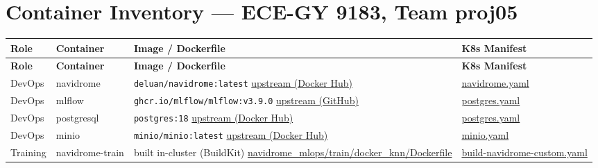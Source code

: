 \documentclass[11pt,a4paper]{article}
\begin{document}
\section*{Container Inventory --- ECE-GY 9183, Team proj05}

\footnotesize
\setlength{\tabcolsep}{5pt}

\begin{longtable}{@{} p{1.5cm} p{2.6cm} p{4.8cm} p{4.4cm} @{}}
\toprule
\textbf{Role} & \textbf{Container} & \textbf{Image / Dockerfile} & \textbf{K8s Manifest} \\
\midrule
\endfirsthead
\toprule
\textbf{Role} & \textbf{Container} & \textbf{Image / Dockerfile} & \textbf{K8s Manifest} \\
\midrule
\endhead
\bottomrule
\endlastfoot

DevOps &
navidrome &
\texttt{deluan/navidrome:latest} \newline
\href{https://hub.docker.com/r/deluan/navidrome}{upstream (Docker Hub)} &
\href{https://github.com/salawhaaat/navidrome-iac/blob/main/k8s/platform/templates/navidrome.yaml}{navidrome.yaml} \\[8pt]

DevOps &
mlflow &
\texttt{ghcr.io/mlflow/mlflow:v3.9.0} \newline
\href{https://github.com/mlflow/mlflow}{upstream (GitHub)} &
\href{https://github.com/salawhaaat/navidrome-iac/blob/main/k8s/platform/templates/postgres.yaml}{postgres.yaml} \\[8pt]

DevOps &
postgresql &
\texttt{postgres:18} \newline
\href{https://hub.docker.com/_/postgres}{upstream (Docker Hub)} &
\href{https://github.com/salawhaaat/navidrome-iac/blob/main/k8s/platform/templates/postgres.yaml}{postgres.yaml} \\[8pt]

DevOps &
minio &
\texttt{minio/minio:latest} \newline
\href{https://hub.docker.com/r/minio/minio}{upstream (Docker Hub)} &
\href{https://github.com/salawhaaat/navidrome-iac/blob/main/k8s/platform/templates/minio.yaml}{minio.yaml} \\[8pt]

Training &
navidrome-train &
built in-cluster (BuildKit) \newline
\href{https://github.com/yeshavyas27/navidrome_mlops/blob/master/train/docker_knn/Dockerfile}{navidrome\_mlops/train/docker\_knn/Dockerfile} &
\href{https://github.com/salawhaaat/navidrome-iac/blob/main/workflows/build-navidrome-custom.yaml}{build-navidrome-custom.yaml} \\[8pt]


\end{longtable}
\end{document}
